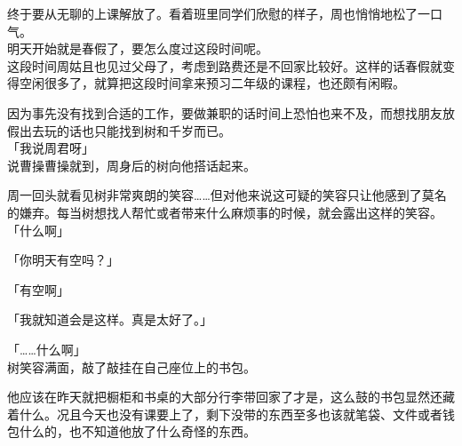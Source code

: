 终于要从无聊的上课解放了。看着班里同学们欣慰的样子，周也悄悄地松了一口气。\\

明天开始就是春假了，要怎么度过这段时间呢。\\

这段时间周姑且也见过父母了，考虑到路费还是不回家比较好。这样的话春假就变得空闲很多了，就算把这段时间拿来预习二年级的课程，也还颇有闲暇。

因为事先没有找到合适的工作，要做兼职的话时间上恐怕也来不及，而想找朋友放假出去玩的话也只能找到树和千岁而已。\\

「我说周君呀」\\

说曹操曹操就到，周身后的树向他搭话起来。

周一回头就看见树非常爽朗的笑容……但对他来说这可疑的笑容只让他感到了莫名的嫌弃。每当树想找人帮忙或者带来什么麻烦事的时候，就会露出这样的笑容。\\

「什么啊」

「你明天有空吗？」

「有空啊」

「我就知道会是这样。真是太好了。」

「……什么啊」\\

树笑容满面，敲了敲挂在自己座位上的书包。

他应该在昨天就把橱柜和书桌的大部分行李带回家了才是，这么鼓的书包显然还藏着什么。况且今天也没有课要上了，剩下没带的东西至多也该就笔袋、文件或者钱包什么的，也不知道他放了什么奇怪的东西。\\

